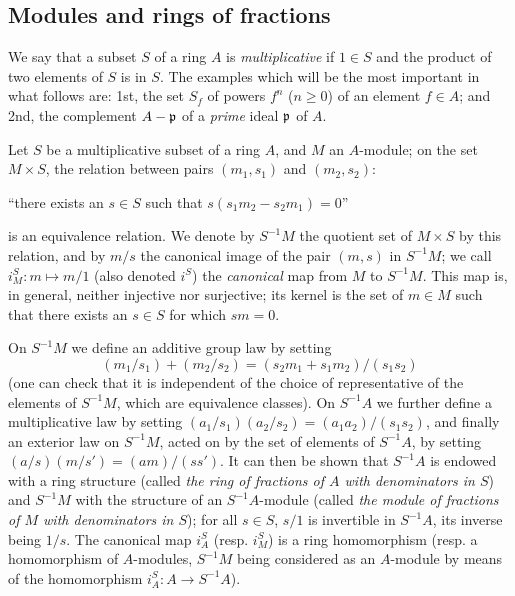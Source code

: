 \subsection{Modules and rings of fractions}
\label{subsection-modules-and-rings-of-fractions}

\begin{env}[1.2.1]
\label{0.1.2.1}
We
say that a subset $S$ of a ring $A$ is \emph{multiplicative} if $1\in S$ and the product of two elements of $S$ is in $S$.
The examples which will be the
most important in what follows are: 1st, the set $S_f$ of
powers $f^n$ ($n\geqslant 0$) of an element $f\in A$; and 2nd, the
complement $A-\mathfrak{p}$ of a \emph{prime} ideal $\mathfrak{p}$ of $A$.
\end{env}

\begin{env}[1.2.2]
\label{0.1.2.2}
Let $S$ be a multiplicative subset of a ring $A$, and $M$ an $A$-module; on the set
$M\times S$, the relation between pairs $(m_1,s_1)$ and $(m_2,s_2)$:
\begin{center}
  ``there exists an $s\in S$ such that $s(s_1 m_2-s_2 m_1)=0$''
\end{center}
is an equivalence relation. We denote by $S^{-1}M$ the quotient set of
$M\times S$ by this relation, and by $m/s$ the canonical image of the pair $(m,s)$ in $S^{-1}M$; we call $i_M^S:m\mapsto m/1$ (also denoted $i^S$) the
\emph{canonical} map from $M$ to $S^{-1}M$. This map is, in general, neither
injective nor surjective; its kernel is the set of $m\in M$ such that there
exists an $s\in S$ for which $sm=0$.

On $S^{-1}M$ we define an additive group law by setting
\[
  (m_1/s_1)+(m_2/s_2)=(s_2 m_1+s_1 m_2)/(s_1 s_2)
\]
(one can check that it is independent of the choice of representative of the elements of $S^{-1}M$, which are equivalence classes).
On $S^{-1}A$ we further define a multiplicative law by setting
$(a_1/s_1)(a_2/s_2)=(a_1 a_2)/(s_1 s_2)$, and finally an exterior law on
$S^{-1}M$, acted on by the set of elements of $S^{-1}A$, by setting
$(a/s)(m/s')=(am)/(ss')$. It can then be shown that $S^{-1}A$ is endowed with a
ring structure (called \emph{the ring of fractions of $A$ with denominators in
$S$}) and $S^{-1}M$ with the structure of an $S^{-1}A$-module (called \emph{the
module of fractions of $M$ with denominators in $S$}); for all $s\in S$, $s/1$
is invertible in $S^{-1}A$, its inverse being $1/s$. The canonical map $i_A^S$
(resp. $i_M^S$) is a ring homomorphism (resp. a homomorphism of $A$-modules,
$S^{-1}M$ being considered as an $A$-module by means of the homomorphism
$i_A^S:A\to S^{-1}A$).
\end{env}

